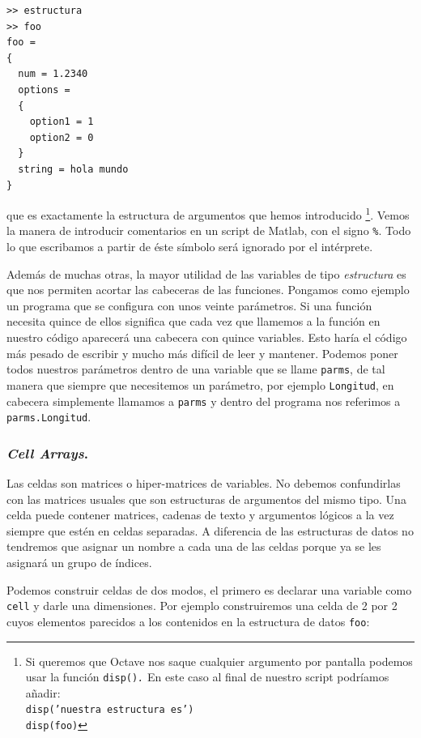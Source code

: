 \begin{verbatim}
>> estructura
>> foo   
foo =   
{   
  num = 1.2340   
  options =   
  {   
    option1 = 1   
    option2 = 0   
  }   
  string = hola mundo   
}
\end{verbatim}
que es exactamente la estructura de argumentos que hemos introducido
%
\footnote{Si queremos que Octave nos saque cualquier argumento por
  pantalla podemos usar la función \texttt{disp()}\texttt{\emph{.}} En
  este caso
  al final de nuestro script podríamos añadir:\\
  \texttt{disp('nuestra estructura es')}~\\
  \texttt{disp(foo)} %
}. Vemos la manera de introducir comentarios en un script de Matlab,
con el signo \texttt{\%}. Todo lo que escribamos a partir de éste
símbolo será ignorado por el intérprete.

Además de muchas otras, la mayor utilidad de las variables de tipo
\emph{estructura} es que nos permiten acortar las cabeceras de las
funciones. Pongamos como ejemplo un programa que se configura con unos
veinte parámetros. Si una función necesita quince de ellos significa
que cada vez que llamemos a la función en nuestro código aparecerá una
cabecera con quince variables. Esto haría el código más pesado de
escribir y mucho más difícil de leer y mantener. Podemos poner todos
nuestros parámetros dentro de una variable que se llame
\texttt{parms}, de tal manera que siempre que necesitemos un
parámetro, por ejemplo \texttt{Longitud}, en cabecera simplemente
llamamos a \texttt{parms} y dentro del programa nos referimos a
\texttt{parms.Longitud}.


\subsubsection{\emph{Cell Arrays}.}

Las celdas son matrices o hiper-matrices de variables.
No debemos confundirlas con las matrices usuales que son estructuras
de argumentos del mismo tipo. Una celda puede contener matrices,
cadenas de texto y argumentos lógicos a la vez siempre que estén en
celdas separadas. A diferencia de las estructuras de datos no
tendremos que asignar un nombre a cada una de las celdas porque ya se
les asignará un grupo de índices.

Podemos construir celdas de dos modos, el primero es declarar una
variable como \texttt{cell} y darle una dimensiones. Por ejemplo
construiremos una celda de 2 por 2 cuyos elementos parecidos a los
contenidos en la estructura de datos \texttt{foo}:

